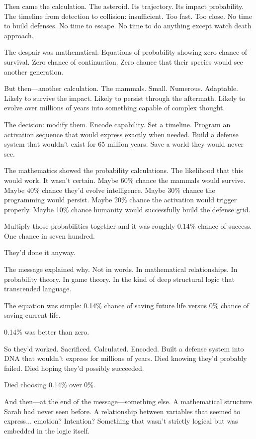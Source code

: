 Then came the calculation. The asteroid. Its trajectory. Its impact probability. The timeline from detection to collision: insufficient. Too fast. Too close. No time to build defenses. No time to escape. No time to do anything except watch death approach.

The despair was mathematical. Equations of probability showing zero chance of survival. Zero chance of continuation. Zero chance that their species would see another generation.

But then—another calculation. The mammals. Small. Numerous. Adaptable. Likely to survive the impact. Likely to persist through the aftermath. Likely to evolve over millions of years into something capable of complex thought.

The decision: modify them. Encode capability. Set a timeline. Program an activation sequence that would express exactly when needed. Build a defense system that wouldn't exist for 65 million years. Save a world they would never see.

The mathematics showed the probability calculations. The likelihood that this would work. It wasn't certain. Maybe 60\% chance the mammals would survive. Maybe 40\% chance they'd evolve intelligence. Maybe 30\% chance the programming would persist. Maybe 20\% chance the activation would trigger properly. Maybe 10\% chance humanity would successfully build the defense grid.

Multiply those probabilities together and it was roughly 0.14\% chance of success. One chance in seven hundred.

They'd done it anyway.

The message explained why. Not in words. In mathematical relationships. In probability theory. In game theory. In the kind of deep structural logic that transcended language.

The equation was simple: 0.14\% chance of saving future life versus 0\% chance of saving current life.

0.14\% was better than zero.

So they'd worked. Sacrificed. Calculated. Encoded. Built a defense system into DNA that wouldn't express for millions of years. Died knowing they'd probably failed. Died hoping they'd possibly succeeded.

Died choosing 0.14\% over 0\%.

And then—at the end of the message—something else. A mathematical structure Sarah had never seen before. A relationship between variables that seemed to express... emotion? Intention? Something that wasn't strictly logical but was embedded in the logic itself.

